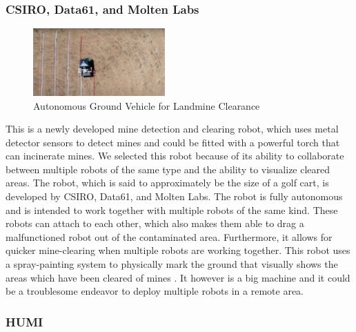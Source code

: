 \newpage

\subsubsection*{CSIRO, Data61, and Molten Labs}

\begin{figure}
    \centering
      \includegraphics[width=0.45\textwidth]{00 - Images/autonomous_ground_vehicle_for_landmine_clearance.jpg}
  \caption{Autonomous Ground Vehicle for Landmine Clearance \cite{CSIRO2020}}
  \label{fig:autonomous_ground_vehicle_for_landmine_clearance}
\end{figure}
This is a newly developed mine detection and clearing robot, which uses metal detector sensors to detect mines and could be fitted with a powerful torch that can incinerate mines. We selected this robot because of its ability to collaborate between multiple robots of the same type and the ability to visualize cleared areas. The robot, which is said to approximately be the size of a golf cart, is developed by CSIRO, Data61, and Molten Labs. The robot is fully autonomous and is intended to work together with multiple robots of the same kind. These robots can attach to each other, which also makes them able to drag a malfunctioned robot out of the contaminated area. Furthermore, it allows for quicker mine-clearing when multiple robots are working together. This robot uses a spray-painting system to physically mark the ground that visually shows the areas which have been cleared of mines \cite{CSIRO2020}. It however is a big machine and it could be a troublesome endeavor to deploy multiple robots in a remote area.


\subsubsection*{HUMI}

